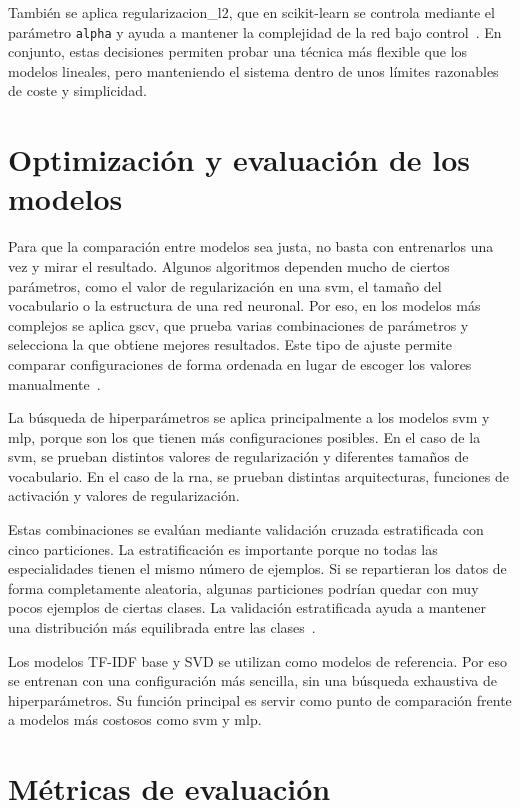 También se aplica \gls{regularizacion_l2}, que en scikit-learn se controla mediante el parámetro \texttt{alpha} y ayuda a mantener la complejidad de la red bajo control~\cite{interactive_chaos_reg}. En conjunto, estas decisiones permiten probar una técnica más flexible que los modelos lineales, pero manteniendo el sistema dentro de unos límites razonables de coste y simplicidad.

\section{Optimización y evaluación de los modelos}

Para que la comparación entre modelos sea justa, no basta con entrenarlos una vez y mirar el resultado. Algunos algoritmos dependen mucho de ciertos parámetros, como el valor de regularización en una \gls{svm}, el tamaño del vocabulario o la estructura de una red neuronal. Por eso, en los modelos más complejos se aplica \gls{gscv}, que prueba varias combinaciones de parámetros y selecciona la que obtiene mejores resultados. Este tipo de ajuste permite comparar configuraciones de forma ordenada en lugar de escoger los valores manualmente~\cite{ibm_clasificacion, cienciadedatos_hiperparametros}.

La búsqueda de hiperparámetros se aplica principalmente a los modelos \gls{svm} y \gls{mlp}, porque son los que tienen más configuraciones posibles. En el caso de la \gls{svm}, se prueban distintos valores de regularización y diferentes tamaños de vocabulario. En el caso de la \gls{rna}, se prueban distintas arquitecturas, funciones de activación y valores de regularización.

Estas combinaciones se evalúan mediante validación cruzada estratificada con cinco particiones. La estratificación es importante porque no todas las especialidades tienen el mismo número de ejemplos. Si se repartieran los datos de forma completamente aleatoria, algunas particiones podrían quedar con muy pocos ejemplos de ciertas clases. La validación estratificada ayuda a mantener una distribución más equilibrada entre las clases~\cite{ibm_clasificacion}.

Los modelos TF-IDF base y SVD se utilizan como modelos de referencia. Por eso se entrenan con una configuración más sencilla, sin una búsqueda exhaustiva de hiperparámetros. Su función principal es servir como punto de comparación frente a modelos más costosos como \gls{svm} y \gls{mlp}.

\section{Métricas de evaluación}

